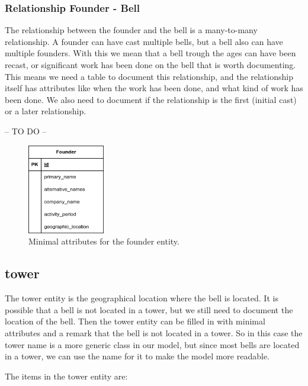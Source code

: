 \documentclass[11pt, a4paper]{article}
\begin{document}
\subsubsection{Relationship Founder - Bell}

The relationship between the founder and the bell is a many-to-many relationship. A founder can have cast multiple bells, but a bell also can have multiple founders. With this we mean that a bell trough the ages can have been recast, or significant work has been done on the bell that is worth documenting. This means we need a table to document this relationship, and the relationship itself has attributes like when the work has been done, and what kind of work has been done. We also need to document if the relationship is the first (initial cast) or a later relationship.

-- TO DO --

\begin{figure}[h!]
    \centering
    \includegraphics[width=0.3\textwidth]{images/founder.png}
    \caption{Minimal attributes for the founder entity.}
    \label{fig:founder-entity}
\end{figure}

\subsection{tower}

The tower entity is the geographical location where the bell is located. It is possible that a bell is not located in a tower, but we still need to document the location of the bell. Then the tower entity can be filled in with minimal attributes and a remark that the bell is not located in a tower. So in this case the tower name is a more generic class in our model, but since most bells are located in a tower, we can use the name for it to make the model more readable.

The items in the tower entity are:
\end{document}
